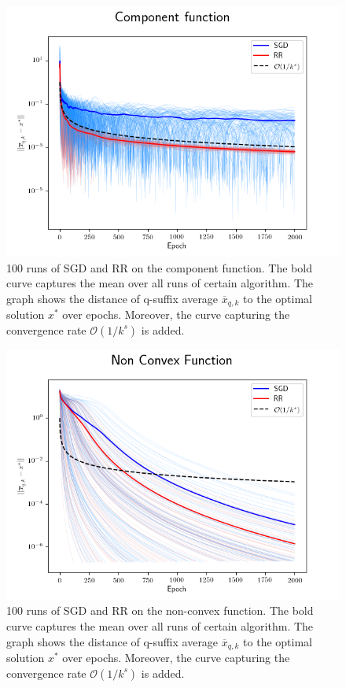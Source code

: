 \documentclass[10pt,conference,compsocconf]{IEEEtran}
\begin{document}
\begin{figure}[h]
  \centering
  \includegraphics[width=\columnwidth]{ComponentFunction_runs_average}
  \caption{100 runs of SGD and RR on the component function.
   The bold curve captures the mean over all runs of certain algorithm.
   The graph shows the distance of q-suffix average
   $\overline{x}_{q,k}$ to the optimal solution $x^*$ over
   epochs. Moreover, the curve capturing the convergence rate
   $\mathcal{O}(1 / k^s)$ is added.}
  \vspace{-3mm}
  \label{fig:component1}
\end{figure}

\begin{figure}[h]
	\centering
	\includegraphics[width=\columnwidth]{Non_Convex_Function_runs_average}
	\caption{100 runs of SGD and RR on the non-convex function.
		The bold curve captures the mean over all runs of certain algorithm.
		The graph shows the distance of q-suffix average
		$\overline{x}_{q,k}$ to the optimal solution $x^*$ over
		epochs. Moreover, the curve capturing the convergence rate
		$\mathcal{O}(1 / k^s)$ is added.}
	\vspace{-3mm}
	\label{fig:nonconvex1}
\end{figure}
\end{document}
